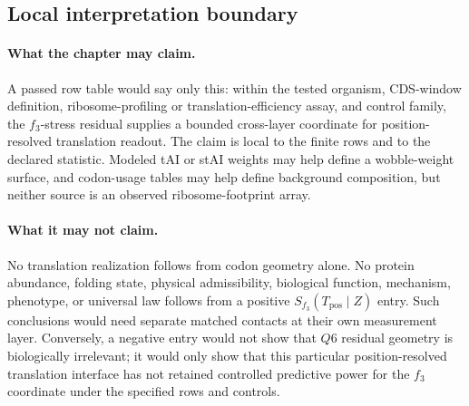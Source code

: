 \subsection{Local interpretation boundary}
\label{sec:q6-f3-stress-local-boundary}

\paragraph{What the chapter may claim.}
A passed row table would say only this: within the tested organism, CDS-window definition, ribosome-profiling or translation-efficiency assay, and control family, the $f_3$-stress residual supplies a bounded cross-layer coordinate for position-resolved translation readout.  The claim is local to the finite rows and to the declared statistic.  Modeled tAI or stAI weights may help define a wobble-weight surface, and codon-usage tables may help define background composition, but neither source is an observed ribosome-footprint array.

\paragraph{What it may not claim.}
No translation realization follows from codon geometry alone.  No protein abundance, folding state, physical admissibility, biological function, mechanism, phenotype, or universal law follows from a positive $S_{f_3}(T_{\mathrm{pos}}\mid Z)$ entry.  Such conclusions would need separate matched contacts at their own measurement layer.  Conversely, a negative entry would not show that $Q6$ residual geometry is biologically irrelevant; it would only show that this particular position-resolved translation interface has not retained controlled predictive power for the $f_3$ coordinate under the specified rows and controls.

